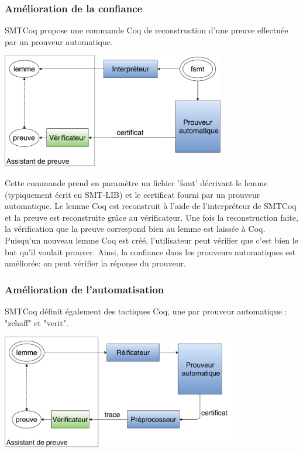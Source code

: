 \documentclass{article}
\begin{document}
\subsubsection{Amélioration de la confiance}


SMTCoq propose une commande Coq de reconstruction d'une preuve effectuée par un prouveur automatique.

\begin{center}
\includegraphics[height=5cm]{Confiance.pdf}
\end{center}

 Cette commande prend en paramètre un fichier 'fsmt' décrivant le lemme (typiquement écrit en SMT-LIB) et le certificat fourni par un prouveur automatique. Le lemme Coq est reconstruit à l'aide de l'interpréteur de SMTCoq et la preuve est reconstruite grâce au vérificateur. Une fois la reconstruction faite, la vérification que la preuve correspond bien au lemme est laissée à Coq. \\

Puisqu'un nouveau lemme Coq est créé, l'utilisateur peut vérifier que c'est bien le but qu'il voulait prouver. Ainsi, la confiance dans les prouveurs automatiques est améliorée: on peut vérifier la réponse du prouveur.


\subsubsection{Amélioration de l'automatisation}

SMTCoq définit également des tactiques Coq, une par prouveur automatique : "zchaff" et "verit". \\


\begin{center}
    \includegraphics[height=5cm]{Automatisation.pdf}
\end{center}
\end{document}
